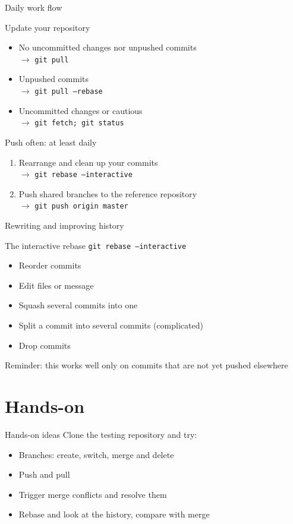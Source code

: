 \documentclass{beamer}
\begin{document}
\begin{frame}{Daily work flow}
  \begin{block}{Update your repository}
    \begin{itemize}
    \item No uncommitted changes nor unpushed commits\\$\rightarrow$ \texttt{git pull}
    \item Unpushed commits\\$\rightarrow$ \texttt{git pull --rebase}
    \item Uncommitted changes or cautious\\$\rightarrow$ \texttt{git fetch; git status}
    \end{itemize}
  \end{block}
  \begin{block}{Push often: at least daily}
    \begin{enumerate}
    \item Rearrange and clean up your commits\\$\rightarrow$ \texttt{git rebase --interactive}
    \item Push shared branches to the reference repository\\$\rightarrow$ \texttt{git push origin master}
    \end{enumerate}
  \end{block}
\end{frame}

\begin{frame}{Rewriting and improving history}
  \begin{block}{The interactive rebase}
    \texttt{git rebase --interactive}
    \begin{itemize}
    \item Reorder commits
    \item Edit files or message
    \item Squash several commits into one
    \item Split a commit into several commits (complicated)
    \item Drop commits
    \end{itemize}
    Reminder: this works well only on commits that are \alert{not yet pushed} elsewhere
  \end{block}
\end{frame}

\section{Hands-on}

\begin{frame}{Hands-on ideas}
Clone the testing repository and try:
\begin{itemize}
\item Branches: create, switch, merge and delete
\item Push and pull
\item Trigger merge conflicts and resolve them
\item Rebase and look at the history, compare with merge
\end{itemize}
\end{frame}
\end{document}

